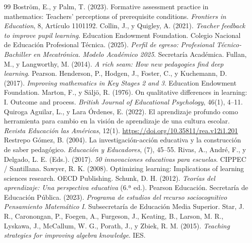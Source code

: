 \documentclass[spanish,letterpaper,oneside]{article}
\begin{document}
\clearpage
\begin{thebibliography}{99}
 Boström, E., y Palm, T. (2023). Formative assessment practice in mathematics: Teachers' perceptions of prerequisite conditions. \textit{Frontiers in Education}, 8, Artículo 1101192.
 Collin, J., y Quigley, A. (2021). \textit{Teacher feedback to improve pupil learning}. Education Endowment Foundation.
 Colegio Nacional de Educación Profesional Técnica. (2025). \textit{Perfil de egreso: Profesional Técnico-Bachiller en Mecatrónica. Modelo Académico 2025}. Secretaría Académica.
 Fullan, M., y Langworthy, M. (2014). \textit{A rich seam: How new pedagogies find deep learning}. Pearson.
 Henderson, P., Hodgen, J., Foster, C., y Kuchemann, D. (2017). \textit{Improving mathematics in Key Stages 2 and 3}. Education Endowment Foundation.
 Marton, F., y Säljö, R. (1976). On qualitative differences in learning: I. Outcome and process. \textit{British Journal of Educational Psychology}, 46(1), 4--11.
 Quiroga Aguilar, L., y Lara Órdenes, E. (2022). El aprendizaje profundo como herramienta para cambio en la visión de aprendizaje de una cultura escolar. \textit{Revista Educación las Américas}, 12(1). \url{https://doi.org/10.35811/rea.v12i1.201}
 Restrepo Gómez, B. (2004). La investigación-acción educativa y la construcción de saber pedagógico. \textit{Educación y Educadores}, (7), 45--55.
 Rivas, A., André, F., y Delgado, L. E. (Eds.). (2017). \textit{50 innovaciones educativas para escuelas}. CIPPEC / Santillana.
 Sawyer, R. K. (2008). Optimizing learning: Implications of learning sciences research. OECD Publishing.
 Schunk, D. H. (2012). \textit{Teorías del aprendizaje: Una perspectiva educativa} (6.ª ed.). Pearson Educación.
 Secretaría de Educación Pública. (2023). \textit{Programa de estudios del recurso sociocognitivo Pensamiento Matemático I}. Subsecretaría de Educación Media Superior.
 Star, J. R., Caronongan, P., Foegen, A., Furgeson, J., Keating, B., Larson, M. R., Lyskawa, J., McCallum, W. G., Porath, J., y Zbiek, R. M. (2015). \textit{Teaching strategies for improving algebra knowledge}. IES.
\end{thebibliography}
\end{document}
